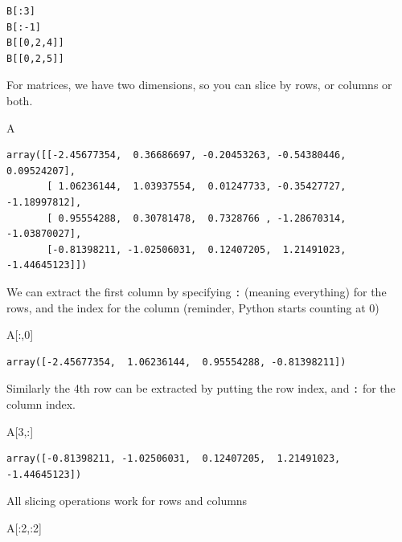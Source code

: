 \documentclass[
  letterpaper,
]{scrbook}
\newenvironment{Shaded}{\begin{snugshade}}{\end{snugshade}}
\newcommand{\DecValTok}[1]{\textcolor[rgb]{0.00,0.00,0.81}{#1}}
\newcommand{\NormalTok}[1]{#1}
\begin{document}
\begin{verbatim}
B[:3]
B[:-1]
B[[0,2,4]]
B[[0,2,5]]
\end{verbatim}

For matrices, we have two dimensions, so you can slice by rows, or columns or both.

\begin{Shaded}
\begin{Highlighting}[]
\NormalTok{A}
\end{Highlighting}
\end{Shaded}

\begin{verbatim}
array([[-2.45677354,  0.36686697, -0.20453263, -0.54380446,  0.09524207],
       [ 1.06236144,  1.03937554,  0.01247733, -0.35427727, -1.18997812],
       [ 0.95554288,  0.30781478,  0.7328766 , -1.28670314, -1.03870027],
       [-0.81398211, -1.02506031,  0.12407205,  1.21491023, -1.44645123]])
\end{verbatim}

We can extract the first column by specifying \texttt{:} (meaning everything) for the rows, and the index for the column (reminder, Python starts counting at 0)

\begin{Shaded}
\begin{Highlighting}[]
\NormalTok{A[:,}\DecValTok{0}\NormalTok{]}
\end{Highlighting}
\end{Shaded}

\begin{verbatim}
array([-2.45677354,  1.06236144,  0.95554288, -0.81398211])
\end{verbatim}

Similarly the 4th row can be extracted by putting the row index, and \texttt{:} for the column index.

\begin{Shaded}
\begin{Highlighting}[]
\NormalTok{A[}\DecValTok{3}\NormalTok{,:]}
\end{Highlighting}
\end{Shaded}

\begin{verbatim}
array([-0.81398211, -1.02506031,  0.12407205,  1.21491023, -1.44645123])
\end{verbatim}

All slicing operations work for rows and columns

\begin{Shaded}
\begin{Highlighting}[]
\NormalTok{A[:}\DecValTok{2}\NormalTok{,:}\DecValTok{2}\NormalTok{]}
\end{Highlighting}
\end{Shaded}
\end{document}
